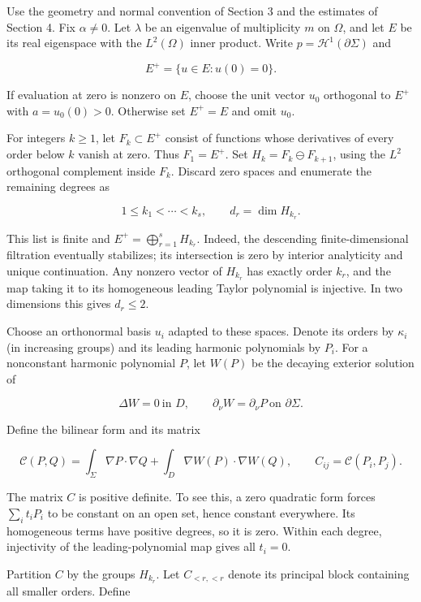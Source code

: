 \documentclass[11pt]{article}
\begin{document}
Use the geometry and normal convention of Section 3 and the estimates of
Section 4. Fix \(\alpha\ne0\). Let \(\lambda\) be an eigenvalue of
multiplicity \(m\) on \(\Omega\), and let \(E\) be its real eigenspace
with the \(L^2(\Omega)\) inner product. Write
\(p=\mathcal H^1(\partial\Sigma)\) and

\[
 E^+=\{u\in E:u(0)=0\}.
\]

If evaluation at zero is nonzero on \(E\), choose the unit vector
\(u_0\) orthogonal to \(E^+\) with \(a=u_0(0)>0\). Otherwise set
\(E^+=E\) and omit \(u_0\).

For integers \(k\ge1\), let \(F_k\subset E^+\) consist of functions
whose derivatives of every order below \(k\) vanish at zero. Thus
\(F_1=E^+\). Set \(H_k=F_k\ominus F_{k+1}\), using the \(L^2\)
orthogonal complement inside \(F_k\). Discard zero spaces and enumerate
the remaining degrees as

\[
 1\le k_1<\cdots<k_s,\qquad d_r=\dim H_{k_r}.
\]

This list is finite and \(E^+=\bigoplus_{r=1}^s H_{k_r}\). Indeed, the
descending finite-dimensional filtration eventually stabilizes; its
intersection is zero by interior analyticity and unique continuation.
Any nonzero vector of \(H_{k_r}\) has exactly order \(k_r\), and the map
taking it to its homogeneous leading Taylor polynomial is injective. In
two dimensions this gives \(d_r\le2\).

Choose an orthonormal basis \(u_i\) adapted to these spaces. Denote its
orders by \(\kappa_i\) (in increasing groups) and its leading harmonic
polynomials by \(P_i\). For a nonconstant harmonic polynomial \(P\), let
\(W(P)\) be the decaying exterior solution of

\[
 \Delta W=0\ \text{in }D,\qquad
 \partial_\nu W=\partial_\nu P\ \text{on }\partial\Sigma.
\]

Define the bilinear form and its matrix

\[
 \mathcal C(P,Q)=\int_\Sigma\nabla P\cdot\nabla Q
                 +\int_D\nabla W(P)\cdot\nabla W(Q),
 \qquad C_{ij}=\mathcal C(P_i,P_j).
 \tag{M1}
\]

The matrix \(C\) is positive definite. To see this, a zero quadratic
form forces \(\sum_i t_iP_i\) to be constant on an open set, hence
constant everywhere. Its homogeneous terms have positive degrees, so it
is zero. Within each degree, injectivity of the leading-polynomial map
gives all \(t_i=0\).

Partition \(C\) by the groups \(H_{k_r}\). Let \(C_{<r,<r}\) denote its
principal block containing all smaller orders. Define
\end{document}
